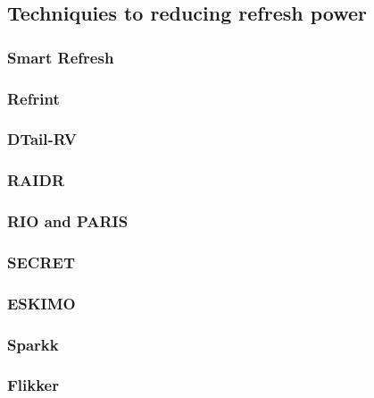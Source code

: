 \subsection{Techniquies to reducing refresh power}


\subsubsection*{\textbf{Smart Refresh}}
\label{par:smartrefresh}


\subsubsection*{\textbf{Refrint}}
\label{par:refrint}


\subsubsection*{\textbf{DTail-RV}}
\label{par:dtail}


\subsubsection*{\textbf{RAIDR}}
\label{par:raidr}


\subsubsection*{\textbf{RIO and PARIS}}
\label{par:rioparis}


\subsubsection*{\textbf{SECRET}}
\label{par:secret}


\subsubsection*{\textbf{ESKIMO}}
\label{par:eskimo}


\subsubsection*{\textbf{Sparkk}}
\label{par:sparkk}


\subsubsection*{\textbf{Flikker}}
\label{par:flikker}


